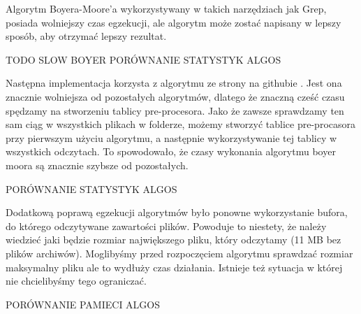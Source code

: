 Algorytm Boyera-Moore'a wykorzystywany w takich narzędziach jak Grep, posiada
wolniejszy czas egzekucji, ale algorytm może zostać napisany w lepszy sposób, 
aby otrzymać lepszy rezultat.

TODO SLOW BOYER
PORÓWNANIE STATYSTYK ALGOS

Następna implementacja korzysta z algorytmu ze strony na githubie 
\cite{bib:internet:BoyerMooreGit}. Jest ona znacznie wolniejsza od pozostałych
algorytmów, dlatego że znaczną cześć czasu spędzamy na stworzeniu tablicy
pre-procesora. Jako że zawsze sprawdzamy ten sam ciąg w wszystkich plikach w
folderze, możemy stworzyć tablice pre-procasora przy pierwszym użyciu algorytmu,
a następnie wykorzystywanie tej tablicy w wszystkich odczytach. To spowodowało, 
że czasy wykonania algorytmu boyer moora są znacznie szybsze od pozostałych.

PORÓWNANIE STATYSTYK ALGOS

Dodatkową poprawą egzekucji algorytmów było ponowne wykorzystanie bufora, do 
którego odczytywane zawartości plików. Powoduje to niestety, że należy wiedzieć
jaki będzie rozmiar największego pliku, który odczytamy (11 MB bez plików 
archiwów). Moglibyśmy przed rozpoczęciem algorytmu sprawdzać rozmiar maksymalny 
pliku ale to wydłuży czas działania. Istnieje też sytuacja w której nie 
chcielibyśmy tego ograniczać. 

PORÓWNANIE PAMIECI ALGOS


